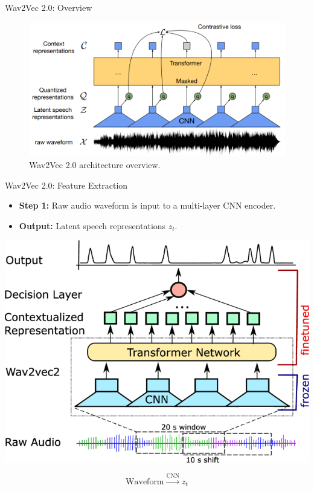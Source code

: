 \begin{frame}[allowframebreaks]{Wav2Vec 2.0: Overview}
\begin{itemize}
\begin{itemize}
        \end{itemize}
    \end{itemize}
    \begin{figure}[h]
        \centering
        \includegraphics[width=\textwidth,height=0.8\textheight,keepaspectratio]{images/audio-nlp/wav2vec2-overview.png}
        \caption*{Wav2Vec 2.0 architecture overview.}
    \end{figure}
\end{frame}

\begin{frame}{Wav2Vec 2.0: Feature Extraction}
    \begin{itemize}
        \item \textbf{Step 1:} Raw audio waveform is input to a multi-layer CNN encoder.
        \item \textbf{Output:} Latent speech representations $z_t$.
    \end{itemize}
    \begin{center}
        \includegraphics[width=\textwidth,height=0.6\textheight,keepaspectratio]{images/audio-nlp/wav2vec2-cnn.png}
    \end{center}
    \[
        \text{Waveform} \xrightarrow{\text{CNN}} z_t
    \]
\end{frame}

